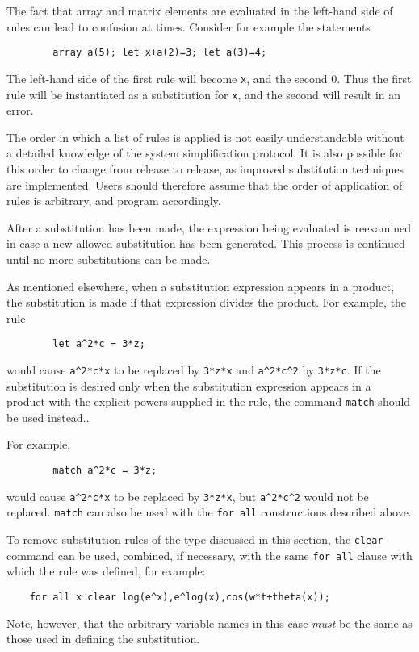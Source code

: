 The fact that array and matrix elements are evaluated in the left-hand side
of rules can lead to confusion at times. Consider for example the
statements
\begin{verbatim}
        array a(5); let x+a(2)=3; let a(3)=4;
\end{verbatim}
The left-hand side of the first rule will become \texttt{x}, and the second
0.  Thus the first rule will be instantiated as a substitution for
\texttt{x}, and the second will result in an error.

The order in which a list of rules is applied is not easily understandable
without a detailed knowledge of the system simplification protocol. It is
also possible for this order to change from release to release, as improved
substitution techniques are implemented. Users should therefore assume
that the order of application of rules is arbitrary, and program
accordingly.

After a substitution has been made, the expression being evaluated is
reexamined in case a new allowed substitution has been generated. This
process is continued until no more substitutions can be made.

\hypertarget{command:MATCH}{}
As mentioned elsewhere, when a substitution expression appears in a
product, the substitution is made if that expression divides the product.
For example, the rule
\begin{verbatim}
        let a^2*c = 3*z;
\end{verbatim}
would cause \texttt{a\textasciicircum 2*c*x} to be replaced by \texttt{3*z*x} and
\texttt{a\textasciicircum 2*c\textasciicircum 2} by \texttt{3*z*c}.  If the substitution is desired only
when the substitution expression appears in a product with the explicit
powers supplied in the rule, the command \texttt{match} should be used
instead..

For example,
\begin{verbatim}
        match a^2*c = 3*z;
\end{verbatim}
would cause \texttt{a\textasciicircum 2*c*x} to be replaced by \texttt{3*z*x}, but
\texttt{a\textasciicircum 2*c\textasciicircum 2} would not be replaced. \texttt{match} can also be used
with the \texttt{for all} constructions described above.

To remove substitution rules of the type discussed in this section, the
\texttt{clear} command can be used, combined, if necessary,
with the same \texttt{for all} clause with which the rule was defined, for
example:
\begin{verbatim}
    for all x clear log(e^x),e^log(x),cos(w*t+theta(x));
\end{verbatim}
Note, however, that the arbitrary variable names in this case \emph{must}
be the same as those used in defining the substitution.

